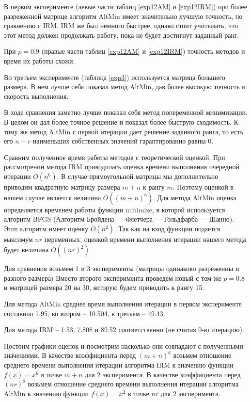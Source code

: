\documentclass[oneside,final,14pt]{extreport} %
\begin{document}
В первом эксперименте (левые части таблиц \ref{exp12AM} и \ref{exp12IRM}) при более разреженной матрице алгоритм AltMin имеет значительно лучшую точность, по сравнению с IRM. IRM же был немного быстрее, однако стоит учитывать, что этот метод должен продолжать работу, пока не будет достигнут заданный ранг.

При $p = 0.9$ (правые части таблиц \ref{exp12AM} и \ref{exp12IRM}) точность методов и время их работы схожи. 

Во третьем эксперименте (таблица \ref{exp3}) используется матрица большего размера. В нем лучше себя показал метод AltMin, дав более высокую точность и скорость выполнения.

В ходе сравнения заметно лучше показал себя метод попеременной минимизации. В целом он дал более точное решение и показал более быструю сходимость. К тому же метод AltMin с первой итерации дает решение заданного ранга, то есть его $n - r$ наименьших собственных значений гарантированно равны 0.

Сравним полученное время работы методов с теоретической оценкой. При рассмотрении метода IRM приводилась оценка времени выполнения очередной итерации $O(n^6)$. В случае прямоугольной матрицы мы дополнительно приводим квадратную матрицу размера $m+n$ к рангу $m$. Поэтому оценкой в нашем случае является величина $O((m + n)^6)$. Для метода AltMin оценка определяется временем работы функции minimize, в которой используется алгоритм BFGS (Алгоритм Бройдена — Флетчера — Гольдфарба — Шанно). Этот алгоритм имеет оценку $O(n^2)$. Так как на вход функции подается максимум $nr$ переменных, оценкой времени выполнения итерации нашего метода будет величина $O((nr)^2)$

Для сравнения возьмем 1 и 3 эксперименты (матрицы одинаково разреженны и разного размера) Вместо второго эксперимента проведем новый с тем же $p = 0.8$ и матрицей размера 20 на 30, которую будем приводить к рангу 15.

Для метода AltMin среднее время выполнения итерации в первом эксперименте составило 1.95, во втором -- 10.504, в третьем -- 49.43.

Для метода IRM -- 1.53, 7.808 и 89.52 соответственно (не считая 0-ю итерацию).

Постоим графики оценок и посмотрим насколько они совпадают с полученными значениями. В качестве коэффициента перед $(m + n)^6$ возьмем отношение среднего времени выполнения итерации алгоритма IRM к значению функции $f(x) = x^6$ в точке $m + n$ для 2 эксперимента. В качестве коэффициента перед $(nr)^2$ возьмем отношение среднего времени выполнения итерации алгоритма AltMin к значению функции $f(x) = x^2$ в точке $nr$ для 2 эксперимента.
\end{document}
